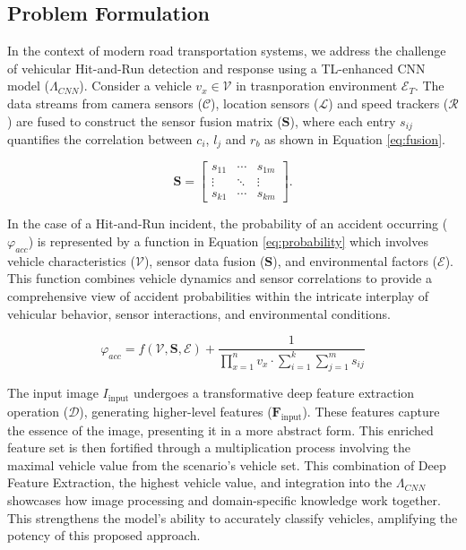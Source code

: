 \documentclass[10pt, conference, a4paper, compsocconf]{IEEEtran}
\begin{document}
\subsection{Problem Formulation}
In the context of modern road transportation systems, we address the challenge of vehicular Hit-and-Run detection and response using a TL-enhanced CNN model ($\Lambda_{CNN}$). Consider a vehicle $v_{x} \in \mathcal{V}$ in trasnporation environment $\mathcal{E}_{T}$. The data streams from camera sensors ($\mathcal{C}$), location sensors ($\mathcal{L}$) and speed trackers ($\mathcal{R}$) are fused to construct the sensor fusion matrix ($\mathbf{S}$), where each entry $s_{ij}$ quantifies the correlation between $c_{i}$, $l_{j}$ and $r_{b}$ as shown in Equation \ref{eq:fusion}.

\begin{equation}\label{eq:fusion}
    \mathbf{S} = \begin{bmatrix}
        s_{11} & \cdots & s_{1m} \\
        \vdots & \ddots & \vdots \\
        s_{k1} & \cdots & s_{km}
    \end{bmatrix}.
\end{equation}

\indent In the case of a Hit-and-Run incident, the probability of an accident occurring ($\varphi_{acc}$) is represented by a function in Equation \ref{eq:probability} which involves vehicle characteristics ($\mathcal{V}$), sensor data fusion ($\mathbf{S}$), and environmental factors ($\mathcal{E}$). This function combines vehicle dynamics and sensor correlations to provide a comprehensive view of accident probabilities within the intricate interplay of vehicular behavior, sensor interactions, and environmental conditions.

\begin{equation}\label{eq:probability}
    \varphi_{acc} = f(\mathcal{V}, \mathbf{S}, \mathcal{E}) + \frac{1}{{\prod_{x=1}^{n} v_{x} \cdot \sum_{i=1}^{k} \sum_{j=1}^{m} s_{ij}}}
\end{equation}

\indent The input image $I_{\text{input}}$ undergoes a transformative deep feature extraction operation ($\mathcal{D}$), generating higher-level features ($\mathbf{F}_{\text{input}}$). These features capture the essence of the image, presenting it in a more abstract form. This enriched feature set is then fortified through a multiplication process involving the maximal vehicle value from the scenario's vehicle set. This combination of Deep Feature Extraction, the highest vehicle value, and integration into the $\Lambda_{CNN}$ showcases how image processing and domain-specific knowledge work together. This strengthens the model's ability to accurately classify vehicles, amplifying the potency of this proposed approach.
\end{document}
